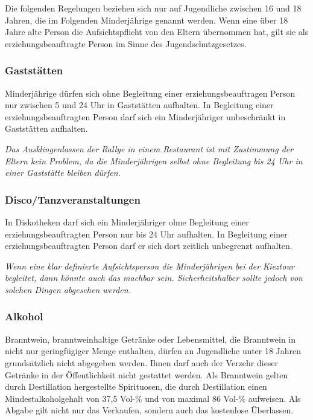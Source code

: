 \documentclass[a4paper,11pt]{scrartcl} %
\begin{document}
Die folgenden Regelungen beziehen sich nur auf Jugendliche zwischen 16 und 18 Jahren, die im Folgenden Minderjährige genannt werden. Wenn eine über 18 Jahre alte Person die Aufsichtspflicht von den Eltern übernommen hat, gilt sie als erziehungsbeauftragte Person im Sinne des Jugendschutzgesetzes.

\subsubsection*{Gaststätten}

Minderjährige dürfen sich ohne Begleitung einer erziehungsbeauftragen Person nur zwischen 5 und 24 Uhr in Gaststätten aufhalten. In Begleitung einer erziehungsbeauftragten Person darf sich ein Minderjähriger unbeschränkt in Gaststätten aufhalten.

\textit{Das Ausklingenlassen der Rallye in einem Restaurant ist mit Zustimmung der Eltern kein Problem, da die Minderjährigen selbst ohne Begleitung bis 24 Uhr in einer Gaststätte bleiben dürfen.}

\subsubsection*{Disco/Tanzveranstaltungen}

In Diskotheken darf sich ein Minderjähriger ohne Begleitung einer erziehungsbeauftragten Person nur bis 24 Uhr aufhalten. In Begleitung einer erziehungsbeauftragten Person darf er sich dort zeitlich unbegrenzt aufhalten.

\textit{Wenn eine klar definierte Aufsichtsperson die Minderjährigen bei der Kieztour begleitet, dann könnte auch das machbar sein. Sicherheitshalber sollte jedoch von solchen Dingen abgesehen werden.}

\subsubsection*{Alkohol}

Branntwein, branntweinhaltige Getränke oder Lebensmittel, die Branntwein in nicht nur geringfügiger Menge enthalten, dürfen an Jugendliche unter 18 Jahren grundsätzlich nicht abgegeben werden. Ihnen darf auch der Verzehr dieser Getränke in der Öffentlichkeit nicht gestattet werden. Als Branntwein gelten durch Destillation hergestellte Spirituosen, die durch Destillation einen Mindestalkoholgehalt von 37,5 Vol-\% und von maximal 86 Vol-\% aufweisen. Als Abgabe gilt nicht nur das Verkaufen, sondern auch das kostenlose Überlassen. 
\end{document}
